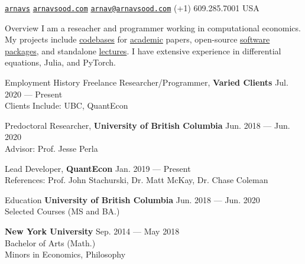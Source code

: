 \documentclass{resume} %
\begin{document}
 \href{https://github.com/arnavs}{\tt arnavs} \vline \hspace{0.5 em} {} \href{https://arnavsood.com}{\tt arnavsood.com} \vline \hspace{0.5 em} {} \href{mailto:arnav@arnavsood.com}{\tt arnav@arnavsood.com} \vline \hspace{0.5 em}  (+1) 609.285.7001 \vline \hspace{0.5 em}  USA 

\begin{rSection}{Overview}
   I am a reseacher and programmer working in computational economics. My projects include \href{https://github.com/jlperla/PerlaTonettiWaugh.jl}{codebases} for \href{https://github.com/jlperla/KnowledgeDiffusionSimulations.jl}{academic} papers, open-source \href{https://github.com/quantecon/expectations.jl}{software} \href{https://github.com/quantecon/instantiatefromurl.jl}{packages}, and standalone \href{https://datascience.quantecon.org/applications/recidivism.html}{lectures}. I have extensive experience in differential equations, Julia, and PyTorch.
\end{rSection}

\begin{rSection}{Employment History}
Freelance Researcher/Programmer, {\bf Varied Clients} \hfill {Jul. 2020 --- Present} 
\\ Clients Include: UBC, QuantEcon \smallskip 
    
Predoctoral Researcher, {\bf University of British Columbia} \hfill {Jun. 2018 --- Jun. 2020} 
\\ Advisor: Prof. Jesse Perla \smallskip 

Lead Developer, {\bf QuantEcon} \hfill {Jan. 2019 --- Present}
\\ References: Prof. John Stachurski, Dr. Matt McKay, Dr. Chase Coleman
\end{rSection}

\begin{rSection}{Education}
{\bf University of British Columbia} \hfill {Jun. 2018 --- Jun. 2020} 
\\ Selected Courses (MS and BA.)  %

{\bf New York University} \hfill {Sep. 2014 --- May 2018} 
\\ Bachelor of Arts (Math.) %
\\ Minors in Economics, Philosophy 
\end{rSection}
\end{document}
